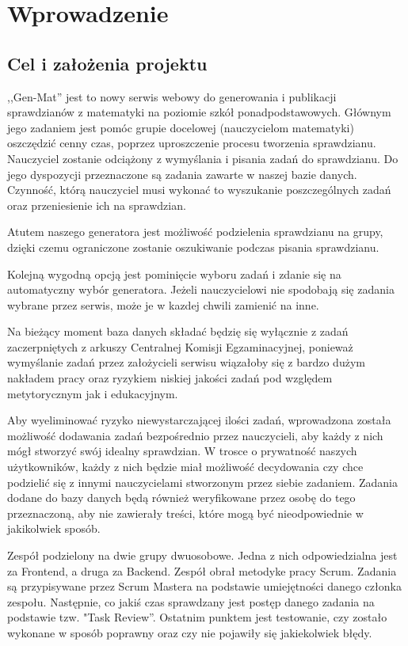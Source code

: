 \documentclass[oneside,polski,logo,indent]{amuthesis}
\begin{document}
\chapter{Wprowadzenie}

\section{Cel i założenia projektu}

,,Gen-Mat'' jest to nowy serwis webowy do generowania i publikacji sprawdzianów z matematyki na poziomie szkół ponadpodstawowych. Głównym jego zadaniem jest pomóc grupie docelowej (nauczycielom matematyki) oszczędzić cenny czas, poprzez uproszczenie procesu tworzenia sprawdzianu. Nauczyciel zostanie odciążony z wymyślania i pisania zadań do sprawdzianu. Do jego dyspozycji przeznaczone są zadania zawarte w naszej bazie danych. Czynność, którą nauczyciel musi wykonać to wyszukanie poszczególnych zadań oraz przeniesienie ich na sprawdzian.

Atutem naszego generatora jest możliwość podzielenia sprawdzianu na grupy, dzięki czemu ograniczone zostanie oszukiwanie podczas pisania sprawdzianu.

Kolejną wygodną opcją jest pominięcie wyboru zadań i zdanie się na automatyczny wybór generatora. Jeżeli nauczycielowi nie spodobają się zadania wybrane przez serwis, może je w kazdej chwili zamienić na inne.

Na bieżący moment baza danych składać będzię się wyłącznie z zadań zaczerpniętych z arkuszy Centralnej Komisji Egzaminacyjnej, ponieważ wymyślanie zadań przez założycieli serwisu wiązałoby się z bardzo dużym nakładem pracy oraz ryzykiem niskiej jakości zadań pod względem metytorycznym jak i edukacyjnym. 

Aby wyeliminować ryzyko niewystarczającej ilości zadań, wprowadzona została możliwość dodawania zadań bezpośrednio przez nauczycieli, aby każdy z nich mógł stworzyć swój idealny sprawdzian. W trosce o prywatność naszych użytkowników, każdy z nich będzie miał możliwość decydowania czy chce podzielić się z innymi nauczycielami stworzonym przez siebie zadaniem. Zadania dodane do bazy danych będą również weryfikowane przez osobę do tego przeznaczoną, aby nie zawierały treści, które mogą być nieodpowiednie w jakikolwiek sposób.

Zespół podzielony na dwie grupy dwuosobowe. Jedna z nich odpowiedzialna jest za Frontend, a druga za Backend. Zespół obrał metodyke pracy Scrum. Zadania są przypisywane przez Scrum Mastera na podstawie umiejętności danego członka zespołu. Następnie, co jakiś czas sprawdzany jest postęp danego zadania na podstawie tzw. "Task Review”. Ostatnim punktem jest testowanie, czy zostało wykonane w sposób poprawny oraz czy nie pojawiły się jakiekolwiek błędy.
\end{document}
